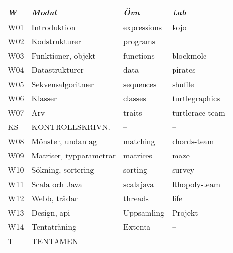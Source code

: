 \begin{tabular}{l|l|l|l}
\textit{W} & \textit{Modul} & \textit{Övn} & \textit{Lab} \\ \hline \hline
W01 & Introduktion & expressions & kojo \\
W02 & Kodstrukturer & programs & -- \\
W03 & Funktioner, objekt & functions & blockmole \\
W04 & Datastrukturer & data & pirates \\
W05 & Sekvensalgoritmer & sequences & shuffle \\
W06 & Klasser & classes & turtlegraphics \\
W07 & Arv & traits & turtlerace-team \\
KS & KONTROLLSKRIVN. & -- & -- \\
W08 & Mönster, undantag & matching & chords-team \\
W09 & Matriser, typparametrar & matrices & maze \\
W10 & Sökning, sortering & sorting & survey \\
W11 & Scala och Java & scalajava & lthopoly-team \\
W12 & Webb, trådar & threads & life \\
W13 & Design, api & Uppsamling & Projekt \\
W14 & Tentaträning & Extenta & -- \\
T & TENTAMEN & -- & -- \\
\end{tabular}
